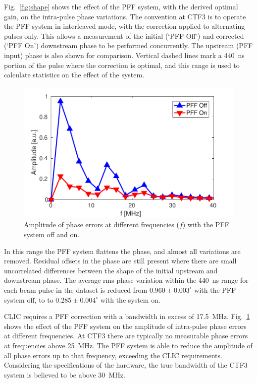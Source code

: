 \documentclass[%
 reprint,
superscriptaddress,
 amsmath,amssymb,
 prl,
]{revtex4-1}
\begin{document}
Fig.~\ref{fig:shape} shows the effect of the PFF system, with the derived 
optimal gain, on the intra-pulse phase variations. The convention at CTF3 is to 
operate the PFF system in interleaved mode, with 
the correction applied to alternating pulses only. This allows a measurement of 
the initial (`PFF Off') and corrected (`PFF On') downstream phase to be 
performed concurrently. The upstream (PFF input) phase is also shown for 
comparison. Vertical dashed lines mark a 440~ns portion of the pulse where the 
correction is optimal, and this range is used to calculate statistics on the 
effect of the system. 

\begin{figure}
	\includegraphics[width=\columnwidth]{figs/fft}%
	\caption{\label{fig:fft}Amplitude of phase errors at different frequencies 
		(\(f\)) with the PFF system off and on.}
\end{figure}

In this range the PFF system flattens the phase, 
and almost all variations are removed. Residual offsets in the phase are still 
present where there are small uncorrelated differences between the shape of the 
initial upstream and downstream phase. 
The average rms phase variation within the 440~ns range 
for each beam pulse in the dataset is reduced from \(0.960\pm0.003^\circ\) with 
the PFF system off, to to \(0.285\pm0.004^\circ\) with the system on.

CLIC requires a PFF correction with a bandwidth in excess of 17.5~MHz. 
Fig.~\ref{fig:fft} shows the effect of the PFF system on the amplitude of 
intra-pulse phase errors at different frequencies. At CTF3 there are typically 
no measurable phase errors at frequencies above 25~MHz. The PFF system is able 
to reduce the amplitude of all phase errors up to that frequency, exceeding the 
CLIC requirements. Considering the specifications of the hardware, the true 
bandwidth of the CTF3 system is believed to be above 30~MHz.
\end{document}
